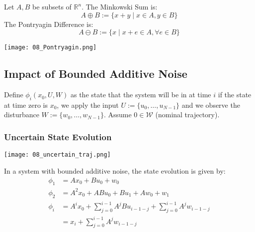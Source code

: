 \newpar{}

Let $A,B$ be subsets of $\mathbb{R}^n$. The Minkowski Sum is:
\begin{equation*}
    A \oplus B := \{x + y \mid x \in A, y \in B\}
\end{equation*}
The Pontryagin Difference is:
\begin{equation*}
    A \ominus B := \{x \mid x + e \in A, \forall e \in B\}
\end{equation*}
\begin{center}
    \texttt{[image: 08\_Pontryagin.png]}
\end{center}

\subsection{Impact of Bounded Additive Noise}
Define $\phi_i(x_0, U, W)$ as the state that the system will be in at time $i$ if the state at time zero is $x_0$, we apply the input $U := \{u_0, \ldots, u_{N-1}\}$ and we observe the disturbance $W := \{w_0, \ldots, w_{N-1}\}$. Assume $0\in \mathcal{W}$ (nominal trajectory).
\subsubsection{Uncertain State Evolution}
\begin{center}
    \texttt{[image: 08\_uncertain\_traj.png]}
\end{center}
In a system with bounded additive noise, the state evolution is given by:
\begin{align*}
    \phi_{1} & =Ax_{0}+Bu_{0}+w_{0}                                                       \\
    \phi_{2} & =A^{2}x_{0}+ABu_{0}+Bu_{1}+Aw_{0}+w_{1}                                    \\
    \phi_{i} & =A^{i}x_{0}+\sum_{j=0}^{i-1}A^{j}Bu_{i-1-j}+\sum_{j=0}^{i-1}A^{j}w_{i-1-j} \\
             & =x_{i}+\sum_{j=0}^{i-1}A^{j}w_{i-1-j}
\end{align*}

